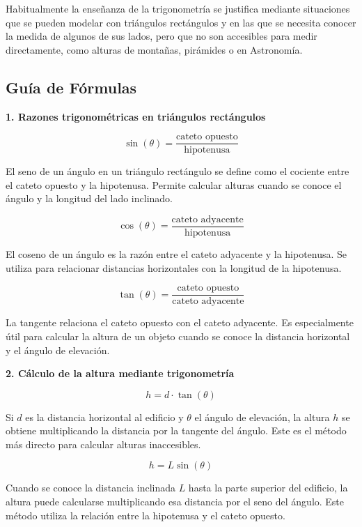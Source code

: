 \documentclass[a4paper,12pt]{extarticle}
\begin{document}
    Habitualmente la enseñanza de la trigonometría se justifica mediante situaciones que se pueden modelar con triángulos rectángulos y en las que se necesita conocer la medida de algunos de sus lados, pero que no son accesibles para medir directamente, como alturas de montañas, pirámides o en Astronomía. 

    \subsection*{Guía de Fórmulas}

    \textbf{1. Razones trigonométricas en triángulos rectángulos}

    \[
    \sin(\theta)=\frac{\text{cateto opuesto}}{\text{hipotenusa}}
    \]

    El seno de un ángulo en un triángulo rectángulo se define como el cociente entre el cateto opuesto y la hipotenusa. Permite calcular alturas cuando se conoce el ángulo y la longitud del lado inclinado.

    \[
    \cos(\theta)=\frac{\text{cateto adyacente}}{\text{hipotenusa}}
    \]

    El coseno de un ángulo es la razón entre el cateto adyacente y la hipotenusa. Se utiliza para relacionar distancias horizontales con la longitud de la hipotenusa.

    \[
    \tan(\theta)=\frac{\text{cateto opuesto}}{\text{cateto adyacente}}
    \]

    La tangente relaciona el cateto opuesto con el cateto adyacente. Es especialmente útil para calcular la altura de un objeto cuando se conoce la distancia horizontal y el ángulo de elevación.

    \vspace{0.3cm}

    \textbf{2. Cálculo de la altura mediante trigonometría}

    \[
    h=d\cdot\tan(\theta)
    \]

    Si \(d\) es la distancia horizontal al edificio y \(\theta\) el ángulo de elevación, la altura \(h\) se obtiene multiplicando la distancia por la tangente del ángulo. Este es el método más directo para calcular alturas inaccesibles.

    \[
    h=L\sin(\theta)
    \]

    Cuando se conoce la distancia inclinada \(L\) hasta la parte superior del edificio, la altura puede calcularse multiplicando esa distancia por el seno del ángulo. Este método utiliza la relación entre la hipotenusa y el cateto opuesto.
\end{document}
